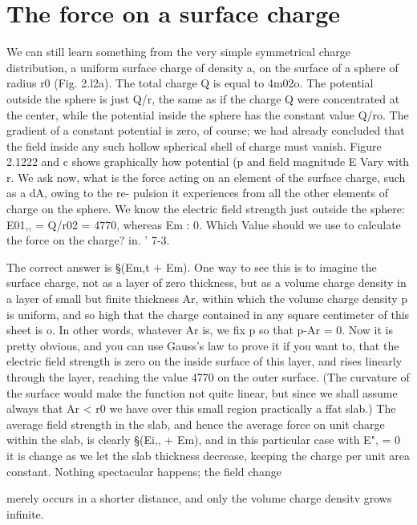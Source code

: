 \section{The force on a surface charge}

We can still learn something from the very simple symmetrical
charge distribution, a uniform surface charge of density a, on the
surface of a sphere of radius r0 (Fig. 2.l2a). The total charge Q is
equal to 4m02o. The potential outside the sphere is just Q/r, the
same as if the charge Q were concentrated at the center, while the
potential inside the sphere has the constant value Q/ro. The gradient
of a constant potential is zero, of course; we had already concluded
that the field inside any such hollow spherical shell of charge must
vanish. Figure 2.1222 and c shows graphically how potential (p and
field magnitude E Vary with r. We ask now, what is the force acting
on an element of the surface charge, such as a dA, owing to the re-
pulsion it experiences from all the other elements of charge on the
sphere. We know the electric field strength just outside the sphere:
E01,, = Q/r02 = 4770, whereas Em : 0. Which Value should we use
to calculate the force on the charge? in. ' 7-3.

The correct answer is §(Em,t + Em). One way to see this is to
imagine the surface charge, not as a layer of zero thickness, but as a
volume charge density in a layer of small but finite thickness Ar,
within which the volume charge density p is uniform, and so high that
the charge contained in any square centimeter of this sheet is o. In
other words, whatever Ar is, we fix p so that p-Ar = 0. Now it is
pretty obvious, and you can use Gauss's law to prove it if you want to,
that the electric field strength is zero on the inside surface of this
layer, and rises linearly through the layer, reaching the value 4770 on
the outer surface. (The curvature of the surface would make the
function not quite linear, but since we shall assume always that
Ar < r0 we have over this small region practically a ffat slab.) The
average field strength in the slab, and hence the average force on unit
charge within the slab, is clearly §(Ei,, + Em), and in this particular
case with E", = 0 it is %
change as we let the slab thickness decrease, keeping the charge per
unit area constant. Nothing spectacular happens; the field change

merely occurs in a shorter distance, and only the volume charge
densitv grows infinite.

